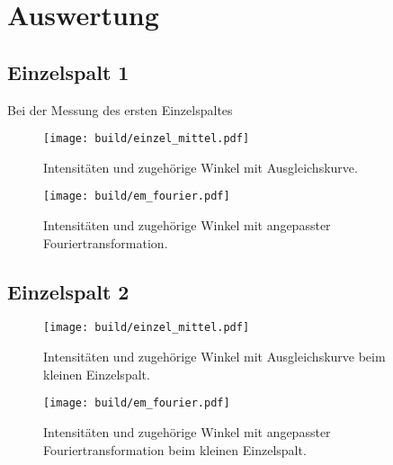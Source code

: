 \section{Auswertung}
\label{sec:Auswertung}
\subsection{Einzelspalt 1}
    Bei der Messung des ersten Einzelspaltes 
    \begin{figure}
        \centering
        \texttt{[image: build/einzel\_mittel.pdf]}
        \caption{Intensitäten und zugehörige Winkel mit Ausgleichskurve.}
        \label{fig:einzel_mittel}
    \end{figure}

    \begin{figure}
        \centering
        \texttt{[image: build/em\_fourier.pdf]}
        \caption{Intensitäten und zugehörige Winkel mit angepasster Fouriertransformation.}
        \label{fig:em_fourier}
    \end{figure}


\subsection{Einzelspalt 2}
    \begin{figure}
        \centering
        \texttt{[image: build/einzel\_mittel.pdf]}
        \caption{Intensitäten und zugehörige Winkel mit Ausgleichskurve beim kleinen Einzelspalt.}
        \label{fig:einzel_klein}
    \end{figure}

    \begin{figure}
        \centering
        \texttt{[image: build/em\_fourier.pdf]}
        \caption{Intensitäten und zugehörige Winkel mit angepasster Fouriertransformation beim kleinen Einzelspalt.}
        \label{fig:ek_fourier}
    \end{figure}
